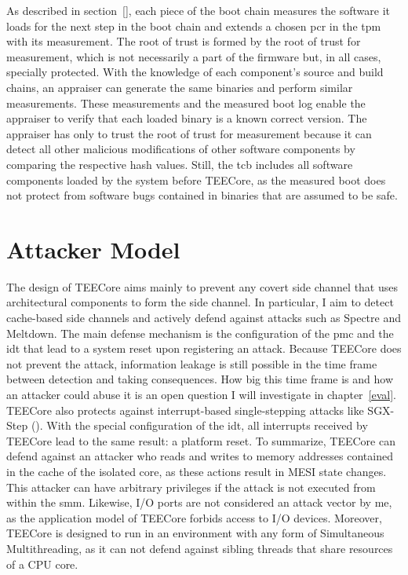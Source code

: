 As described in section~\ref{}, each
piece of the boot chain measures the software it loads for the next step in the
boot chain and extends a chosen \gls{pcr} in the \gls{tpm} with its measurement.
The root of trust is formed by the root of trust for measurement, which is not
necessarily a part of the firmware but, in all cases, specially protected. With
the knowledge of each component's source and build chains, an appraiser can
generate the same binaries and perform similar measurements. These measurements
and the measured boot log enable the appraiser to verify that each loaded binary
is a known correct version. The appraiser has only to trust the root of trust
for measurement because it can detect all other malicious modifications of other
software components by comparing the respective hash values. Still, the
\gls{tcb} includes all software components loaded by the system before TEECore,
as the measured boot does not protect from software bugs contained in binaries
that are assumed to be safe.

\section{Attacker Model}
\label{sec:30:tee_attacker_model}
The design of TEECore aims mainly to prevent any covert side channel that uses
architectural components to form the side channel. In particular, I aim to
detect cache-based side channels and actively defend against attacks such as
Spectre and Meltdown. The main defense mechanism is the configuration of the
\gls{pmc} and the \gls{idt} that lead to a system reset upon registering an
attack. Because TEECore does not prevent the attack, information leakage is
still possible in the time frame between detection and taking consequences. How
big this time frame is and how an attacker could abuse it is an open question I
will investigate in chapter~\ref{eval}. TEECore also
protects against interrupt-based single-stepping attacks like SGX-Step
(). With the special configuration of the \gls{idt},
all interrupts received by TEECore lead to the same result: a platform reset. To
summarize, TEECore can defend against an attacker who reads and writes to memory
addresses contained in the cache of the isolated core, as these actions result
in MESI state changes. This attacker can have arbitrary privileges if the attack
is not executed from within the \gls{smm}. Likewise, I/O ports are not
considered an attack vector by me, as the application model of TEECore forbids
access to I/O devices. Moreover, TEECore is designed to run in an environment
with any form of Simultaneous Multithreading, as it can not defend against
sibling threads that share resources of a CPU core.\\

